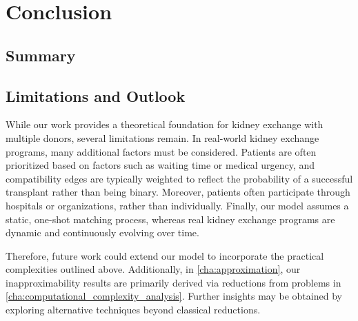 \chapter{Conclusion}
\label{cha:conclusion}



\section{Summary}



\section{Limitations and Outlook}

While our work provides a theoretical foundation for kidney exchange with multiple donors, several limitations remain. In real-world kidney exchange programs, many additional factors must be considered. Patients are often prioritized based on factors such as waiting time or medical urgency, and compatibility edges are typically weighted to reflect the probability of a successful transplant rather than being binary. Moreover, patients often participate through hospitals or organizations, rather than individually. Finally, our model assumes a static, one-shot matching process, whereas real kidney exchange programs are dynamic and continuously evolving over time.

Therefore, future work could extend our model to incorporate the practical complexities outlined above. Additionally, in \autoref{cha:approximation}, our inapproximability results are primarily derived via reductions from problems in \autoref{cha:computational_complexity_analysis}. Further insights may be obtained by exploring alternative techniques beyond classical reductions.



